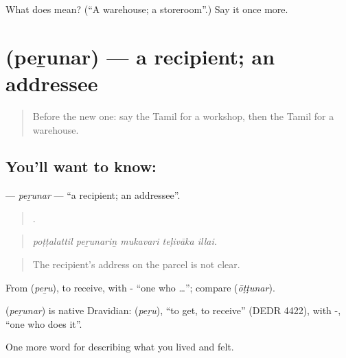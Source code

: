 \begin{tcolorbox}[breakable,colback=teal!4,colframe=teal!35!black,title={Before you move on}]
What does  mean? (\textquotedblleft{}A warehouse; a storeroom\textquotedblright{}.) Say it once more.
\end{tcolorbox}
\section[\texorpdfstring{\ta{பெறுநர்} (peṟunar)}{பெறுநர் (peṟunar)}]{ (peṟunar) — a recipient; an addressee}

\label{lesson:TA-C514-perunar}



\begin{quote}
Before the new one: say the Tamil for a workshop, then the Tamil for a warehouse.
\end{quote}

\subsection*{You'll want to know: }
\textbf{} — \emph{peṟunar} — \textquotedblleft{}a recipient; an addressee\textquotedblright{}.

\begin{quote}
    .
\end{quote}

\begin{quote}
\emph{poṭṭalattil peṟunariṉ mukavari teḷivāka illai.}
\end{quote}

\begin{quote}
The recipient's address on the parcel is not clear.
\end{quote}

From  (\emph{peṟu}), to receive, with - \textquotedblleft{}one who …\textquotedblright{}; compare  (\emph{ōṭṭunar}).

\begin{cousinweb}
\textbf{} (\emph{peṟunar}) is native Dravidian:  (\emph{peṟu}), \textquotedblleft{}to get, to receive\textquotedblright{} (DEDR 4422), with -, \textquotedblleft{}one who does it\textquotedblright{}.
\end{cousinweb}

\begin{grammarlens}[title={What you've built}]
One more word for describing what you lived and felt.
\end{grammarlens}

